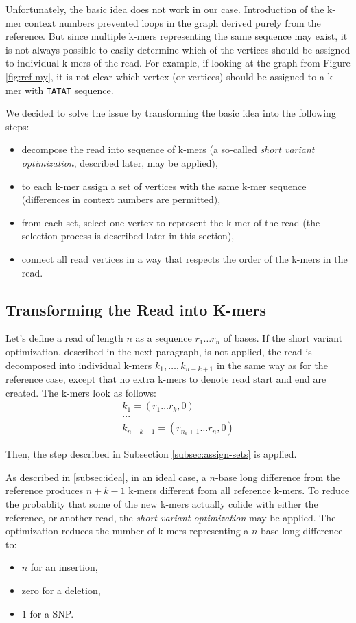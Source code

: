 Unfortunately, the basic idea does not work in our case. Introduction of the k-mer context numbers prevented loops in the graph derived purely from the reference. But since multiple k-mers representing the same sequence may exist, it is not always possible to easily determine which of the vertices should be assigned to individual k-mers of the read. For example, if looking at the graph from Figure \ref{fig:ref-my}, it is not clear which vertex (or vertices) should be assigned to a k-mer with \texttt{TATAT} sequence. 

We decided to solve the issue by transforming the basic idea into the following steps:
\begin{itemize}
\item decompose the read into sequence of k-mers (a so-called \textit{short variant optimization}, described later, may be applied),
\item to each k-mer assign a set of vertices with the same k-mer sequence (differences in context numbers are permitted),
\item from each set, select one vertex to represent the k-mer of the read (the selection process is described later in this section),
\item connect all read vertices in a way that respects the order of the k-mers in the read.
\end{itemize}

\subsection{Transforming the Read into K-mers}
\label{subsec:transforming-the-read-info-k-mers}

Let's define a read of length $n$ as a sequence $r_1 \ldots r_n$ of bases. If the short variant optimization, described in the next paragraph, is not applied, the read is decomposed into individual k-mers $k_1, \ldots , k_{n-k+1}$ in the same way as for the reference case, except that no extra k-mers to denote read start and end are created. The k-mers look as follows:
\begin{align}
k_1 = (r_1 \ldots r_k, 0) \\
... \\
k_{n-k+1} = (r_{n_k+1} \ldots r_n, 0)
\end{align}

Then, the step described in Subsection \ref{subsec:assign-sets} is applied.

As described in \ref{subsec:idea}, in an ideal case, a $n$-base long difference from the reference produces $n + k - 1$ k-mers different from all reference k-mers. To reduce the probablity that some of the new k-mers actually colide with either the reference, or another read, the \textit{short variant optimization} may be applied. The optimization reduces the number of k-mers representing a $n$-base long difference to:
\begin{itemize}
\item $n$ for an insertion,
\item zero for a deletion,
\item $1$ for a SNP.
\end{itemize}

